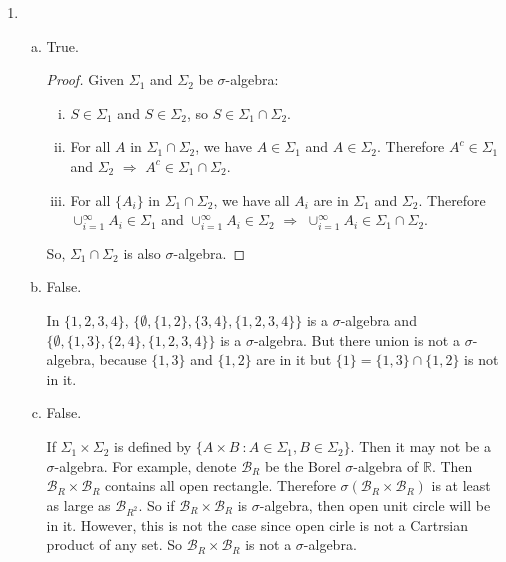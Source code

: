 \documentclass[11pt]{article}
\begin{document}
\begin{enumerate}[1.]
    \item 
    \begin{enumerate}[(a)]
        \item
        True.
        \begin{proof}
            Given $\Sigma_1$ and $\Sigma_2$ be $\sigma$-algebra:
            \begin{enumerate}[i.]
                \item
                $S \in \Sigma_1$ and $S \in \Sigma_2$, so $S \in \Sigma_1 \cap \Sigma_2$.
                \item
                For all $A$ in $\Sigma_1 \cap \Sigma_2$, we have $A \in \Sigma_1$ and $A \in \Sigma_2$. 
                Therefore $A^c \in \Sigma_1$ and $\Sigma_2$ $\Rightarrow$ $A^c \in \Sigma_1 \cap \Sigma_2$.
                \item
                For all $\{A_i\}$ in $\Sigma_1 \cap \Sigma_2$, we have all $A_i$ are in $\Sigma_1$ and $\Sigma_2$. 
                Therefore $\cup_{i=1}^\infty A_i \in \Sigma_1$ and $\cup_{i=1}^\infty A_i \in \Sigma_2$ $\Rightarrow$ $\cup_{i=1}^\infty A_i \in \Sigma_1 \cap \Sigma_2$.
            \end{enumerate}
            So, $\Sigma_1 \cap \Sigma_2$ is also $\sigma$-algebra.
        \end{proof}
        
        \item
        False.

        In $\{1,2,3,4\}$, $\{\emptyset, \{1,2\}, \{3,4\}, \{1,2,3,4\}\}$ is a $\sigma$-algebra and $\{\emptyset, \{1,3\}, \{2,4\}, \{1,2,3,4\}\}$ is a $\sigma$-algebra.
        But there union is not a $\sigma$-algebra, because $\{1,3\}$ and $\{1,2\}$ are in it but $\{1\} = \{1,3\} \cap \{1,2\}$ is not in it.
        
        \item
        False.

        If $\Sigma_1 \times \Sigma_2$ is defined by $\{A \times B \ : A \in \Sigma_1, B \in \Sigma_2\}$. Then it may not be a $\sigma$-algebra.
        For example, denote $\mathcal{B}_R$ be the Borel $\sigma$-algebra of $\mathbb{R}$. Then $\mathcal{B}_R \times \mathcal{B}_R$ contains all open rectangle. Therefore $\sigma(\mathcal{B}_R \times \mathcal{B}_R)$ is at least as large as $\mathcal{B}_{R^2}$.
        So if $\mathcal{B}_R \times \mathcal{B}_R$ is $\sigma$-algebra, then open unit circle will be in it. However, this is not the case since open cirle is not a Cartrsian product of any set. So $\mathcal{B}_R \times \mathcal{B}_R$ is not a $\sigma$-algebra.


\end{enumerate}
\end{enumerate}
\end{document}
